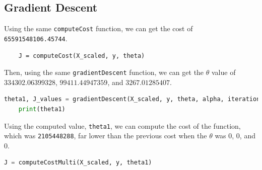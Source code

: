 \documentclass{article}
\begin{document}
\subsection{Gradient Descent}
Using the same \texttt{computeCost} function, we can get the cost of \texttt{65591548106.45744}.
\begin{lstlisting}
    J = computeCost(X_scaled, y, theta)
\end{lstlisting}

Then, using the same \texttt{gradientDescent} function, we can get the $\theta$ value of $334302.06399328$, $99411.44947359$, and $3267.01285407$.
\begin{lstlisting}[language=Python]
    theta1, J_values = gradientDescent(X_scaled, y, theta, alpha, iterations)
    print(theta1)
\end{lstlisting}

Using the computed value, \texttt{theta1}, we can compute the cost of the function, which was \texttt{2105448288}, far lower than the previous cost when the $\theta$ was 0, 0, and 0.

\begin{lstlisting}[language=Python]
  J = computeCostMulti(X_scaled, y, theta1)
\end{lstlisting}



\end{document}
